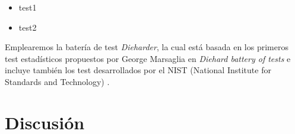 \documentclass[../proyecto.tex]{memoir}
\begin{document}
\begin{itemize}
\item test1
\item test2
\end{itemize}

Emplearemos la batería de test \textit{Dieharder}, la cual está basada en los primeros test estadísticos propuestos por George Marsaglia en \textit{Diehard battery of tests} e incluye también los test desarrollados por el NIST (National Institute for Standards and Technology) \cite{dieharder}.

\section{Discusión}
\end{document}
